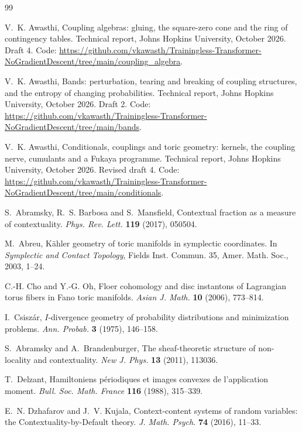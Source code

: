 \documentclass[11pt]{article}
\theoremstyle{definition}
\theoremstyle{remark}
\begin{document}
\begin{thebibliography}{99}

V.~K. Awasthi, Coupling algebras: gluing, the square-zero cone and the ring of contingency tables. Technical report, Johns
Hopkins University, October 2026. Draft 4. Code: \url{https://github.com/vkawasth/Trainingless-Transformer-NoGradientDescent/tree/main/coupling_algebra}.

V.~K. Awasthi, Bands: perturbation, tearing and breaking of coupling structures, and the entropy of changing probabilities.
Technical report, Johns Hopkins University, October 2026. Draft 2. Code: \url{https://github.com/vkawasth/Trainingless-Transformer-NoGradientDescent/tree/main/bands}.

V.~K. Awasthi, Conditionals, couplings and toric geometry: kernels, the coupling nerve, cumulants and a {F}ukaya
programme. Technical report, Johns Hopkins University, October 2026. Revised draft 4. Code: \url{https://github.com/vkawasth/Trainingless-Transformer-NoGradientDescent/tree/main/conditionals}.

S.~Abramsky, R.~S. Barbosa and S.~Mansfield, Contextual fraction as a measure of contextuality. \emph{Phys. Rev. Lett.}
\textbf{119} (2017), 050504.

M.~Abreu, Kähler geometry of toric manifolds in symplectic coordinates. In \emph{Symplectic and Contact Topology}, Fields Inst.
Commun. 35, Amer. Math. Soc., 2003, 1--24.

C.-H. Cho and Y.-G. Oh, Floer cohomology and disc instantons of Lagrangian torus fibers in Fano toric manifolds. \emph{Asian J.
Math.} \textbf{10} (2006), 773--814.

I.~Csiszár, {$I$}-divergence geometry of probability distributions and minimization problems. \emph{Ann. Probab.} \textbf{3}
(1975), 146--158.

S.~Abramsky and A.~Brandenburger, The sheaf-theoretic structure of non-locality and contextuality. \emph{New J. Phys.} \textbf{13}
(2011), 113036.

T.~Delzant, Hamiltoniens périodiques et images convexes de l'application moment. \emph{Bull. Soc. Math. France} \textbf{116}
(1988), 315--339.

E.~N. Dzhafarov and J.~V. Kujala, Context-content systems of random variables: the Contextuality-by-Default theory. \emph{J. Math.
Psych.} \textbf{74} (2016), 11--33.


\end{thebibliography}
\end{document}
